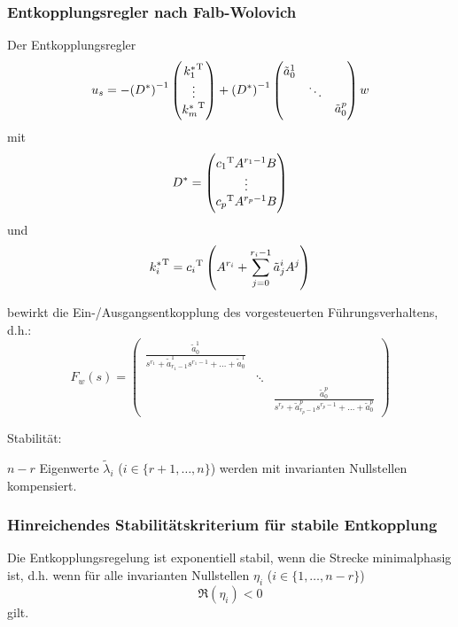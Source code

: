 \subsubsection{Entkopplungsregler nach Falb-Wolovich}
Der Entkopplungsregler 
\begin{equation}
    u_s = - {(D^*)}^{-1} \begin{pmatrix}
            {k_1^*}^\text{T} \\ \vdots \\ {k_m^*}^\text{T}
        \end{pmatrix} +
        {(D^*)}^{-1} \begin{pmatrix}
            \tilde{a}_0^1 \\
             & \ddots \\
             & & \tilde{a}_0^p
        \end{pmatrix} w
\end{equation}
mit
\begin{equation}
    D^* = \begin{pmatrix}
            {c_1}^\text{T} A^{r_1-1} B \\
            \vdots \\
            {c_p}^\text{T} A^{r_p-1} B \\
        \end{pmatrix}
\end{equation}
und
\begin{equation}
    {k^*_i}^\text{T} = {c_i}^\text{T} \left(A^{r_i} + \sum_{j=0}^{r_i-1} \tilde{a}_j^i A^j \right)
\end{equation}

bewirkt die Ein-/Ausgangsentkopplung des vorgesteuerten Führungsverhaltens, d.h.:
\begin{equation}
    F_w(s) = \begin{pmatrix}
        \frac{\tilde{a}_0^1}{s^{r_1} + \tilde{a}^1_{r_1-1} s^{r_1-1} + \ldots + \tilde{a}_0^1} \\
        & \ddots \\
        & & \frac{\tilde{a}_0^p}{s^{r_p} + \tilde{a}^p_{r_p-1} s^{r_p-1} + \ldots + \tilde{a}_0^p} 
    \end{pmatrix}
\end{equation}

Stabilität:

$n-r$ Eigenwerte $\tilde{\lambda}_i$ ($i\in\{r+1, \ldots, n\}$) werden mit invarianten
Nullstellen kompensiert.

\subsubsection{Hinreichendes Stabilitätskriterium für stabile Entkopplung}
Die Entkopplungsregelung ist exponentiell stabil, wenn die Strecke minimalphasig ist,
d.h. wenn für alle invarianten Nullstellen $\eta_i$ ($i\in \{1, \ldots, n-r\}$)
\begin{equation}
    \Re(\eta_i) < 0
\end{equation}
gilt.

